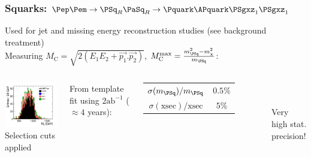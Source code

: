 \documentclass{beamer}
\begin{document}
\begin{frame}
\frametitle{Squarks: $\Pep\Pem \to \PSq_R\PaSq_R\to\Pquark\APquark\PSgxz_1\PSgxz_1$} 
Used for \alert{jet and missing energy reconstruction} studies (see background
treatment)\\ Measuring $M_{\textrm{C}} = \sqrt{2(E_1E_2+\vec{p_1}.\vec{p_2})}$,
$M_{\textrm{C}}^{\textrm{max}}=\frac{m_{\PSq}^2 - m_{\chi}^2}{m_{\PSq}}$:
\begin{columns}[c]
\column{6cm}
\begin{center}
\includegraphics[width=6cm]{BackgroundRejection_MCwithBDTCut.pdf}\\
Selection cuts applied
\end{center}
\column{6cm}
From template fit using $2\textrm{ab}^{-1}$ ($\approx4$ years):\\
\begin{tabular}{cc}
\toprule
$\sigma(m_{\PSq})/m_{\PSq}$ & $0.5\%$\\
$\sigma(\textrm{xsec})/\textrm{xsec}$ & $5\%$\\
\bottomrule
\end{tabular}\\
~\\
\alert{Very high stat. precision!}
\end{columns}
\end{frame}
\end{document}
